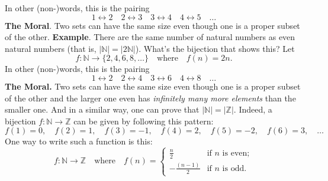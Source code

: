 \documentclass{report}
\begin{document}
\begin{itemize}
            In other (non-)words, this is the pairing
            \[
                1 \leftrightarrow 2 \quad 2 \leftrightarrow 3 \quad 3 \leftrightarrow 4 \quad 4 \leftrightarrow 5 \quad \dots
            \]
            \bigbreak \noindent 
            \textbf{The Moral}. Two sets can have the same size even though one is a proper subset of the other.
            \bigbreak \noindent 
            \textbf{Example}. There are the same number of natural numbers as even natural
            numbers (that is, \( |\mathbb{N}| = |2\mathbb{N}| \)). What’s the bijection that shows this? Let
            \[
                f : \mathbb{N} \to \{2, 4, 6, 8, \dots\} \quad \text{where} \quad f(n) = 2n.
            \]
            In other (non-)words, this is the pairing
            \[
                1 \leftrightarrow 2 \quad 2 \leftrightarrow 4 \quad 3 \leftrightarrow 6 \quad 4 \leftrightarrow 8 \quad \dots
            \]
            \textbf{The Moral.} Two sets can have the same size even though one is a proper subset of the other 
            and the larger one even has \textit{infinitely many more elements} than the smaller one.
            \bigbreak \noindent 
            And in a similar way, one can prove that \( |\mathbb{N}| = |\mathbb{Z}| \). Indeed, a bijection 
            \( f : \mathbb{N} \to \mathbb{Z} \) can be given by following this pattern:
            \[
                f(1) = 0, \quad f(2) = 1, \quad f(3) = -1, \quad f(4) = 2, \quad f(5) = -2, \quad f(6) = 3, \quad \dots
            \]
            \bigbreak \noindent 
            One way to write such a function is this:
            \[
                f : \mathbb{N} \to \mathbb{Z} \quad \text{where} \quad 
                f(n) = 
                \begin{cases} 
                    \frac{n}{2} & \text{if } n \text{ is even}; \\
                    -\frac{(n-1)}{2} & \text{if } n \text{ is odd}.
                \end{cases}
            \]


    \end{itemize}

    \pagebreak 
\end{document}
